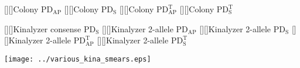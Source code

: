 \documentclass[11pt]{article}
\newcommand{\PDS}{\mathrm{PD_S}}
\newcommand{\PDST}{\mathrm{PD_S^T}}
\newcommand{\W}{\mathrm{PD_{AP}}} %
\newcommand{\WT}{\mathrm{PD_{AP}^T}}
\begin{document}
\pagestyle{empty}

\begin{center}
[][]{{\sf Colony} $\W$}
[][]{{\sf Colony} $\PDS$}
[][]{{\sf Colony} $\WT$}
[][]{{\sf Colony} $\PDST$}

[][]{{\sf Kinalyzer consense} $\PDS$}
[][]{{\sf Kinalyzer 2-allele} $\W$}
[][]{{\sf Kinalyzer 2-allele} $\PDS$}
[][]{{\sf Kinalyzer 2-allele} $\WT$}
[][]{{\sf Kinalyzer 2-allele} $\PDST$}




\texttt{[image: ../various\_kina\_smears.eps]}

\end{center}




 
\end{document}
